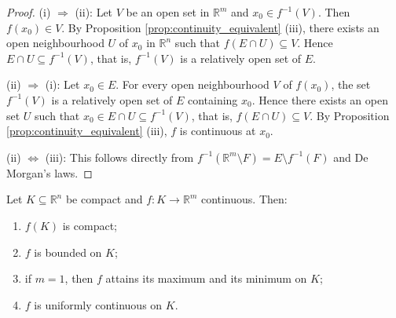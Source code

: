 \begin{proof}
(i) $\Rightarrow$ (ii): Let $V$ be an open set in $\mathbb{R}^m$ and $x_0 \in f^{-1}(V)$. Then $f(x_0) \in V$. By Proposition \ref{prop:continuity_equivalent} (iii), there exists an open neighbourhood $U$ of $x_0$ in $\mathbb{R}^n$ such that $f(E \cap U) \subseteq V$. Hence $E \cap U \subseteq f^{-1}(V)$, that is, $f^{-1}(V)$ is a relatively open set of $E$.

(ii) $\Rightarrow$ (i): Let $x_0 \in E$. For every open neighbourhood $V$ of $f(x_0)$, the set $f^{-1}(V)$ is a relatively open set of $E$ containing $x_0$. Hence there exists an open set $U$ such that $x_0 \in E \cap U \subseteq f^{-1}(V)$, that is, $f(E \cap U) \subseteq V$. By Proposition \ref{prop:continuity_equivalent} (iii), $f$ is continuous at $x_0$.

(ii) $\iff$ (iii): This follows directly from $f^{-1}(\mathbb{R}^m \setminus F) = E \setminus f^{-1}(F)$ and De Morgan's laws.
\end{proof}

\begin{theorem}\label{thm:continuous_compact}
Let $K \subseteq \mathbb{R}^n$ be compact and $f: K \to \mathbb{R}^m$ continuous. Then:
\begin{enumerate}[label=(\roman*)]
    \item $f(K)$ is compact;
    \item $f$ is bounded on $K$;
    \item if $m = 1$, then $f$ attains its maximum and its minimum on $K$;
    \item $f$ is uniformly continuous on $K$.
\end{enumerate}
\end{theorem}

